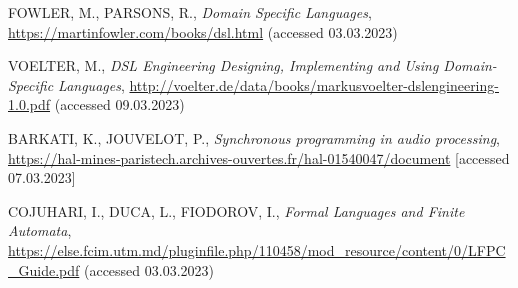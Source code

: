 \begin{thebibliography}{99}
\singlespace \normalsize

    FOWLER, M., PARSONS, R., 
    \textit{ Domain Specific Languages}, 
    \url{ https://martinfowler.com/books/dsl.html} 
    (accessed 03.03.2023) 
    
    VOELTER, M., 
    \textit{ DSL Engineering Designing, Implementing and Using Domain-Specific Languages}, \url{http://voelter.de/data/books/markusvoelter-dslengineering-1.0.pdf} 
    (accessed 09.03.2023) 

    BARKATI, K., JOUVELOT, P., 
    \textit{ Synchronous programming in audio processing}, \url{https://hal-mines-paristech.archives-ouvertes.fr/hal-01540047/document} 
    [accessed 07.03.2023] 
    
    COJUHARI, I., DUCA, L., FIODOROV, I., 
    \textit{ Formal Languages and Finite Automata}, \url{https://else.fcim.utm.md/pluginfile.php/110458/mod_resource/content/0/LFPC_Guide.pdf} 
    (accessed 03.03.2023) 

\end{thebibliography}

